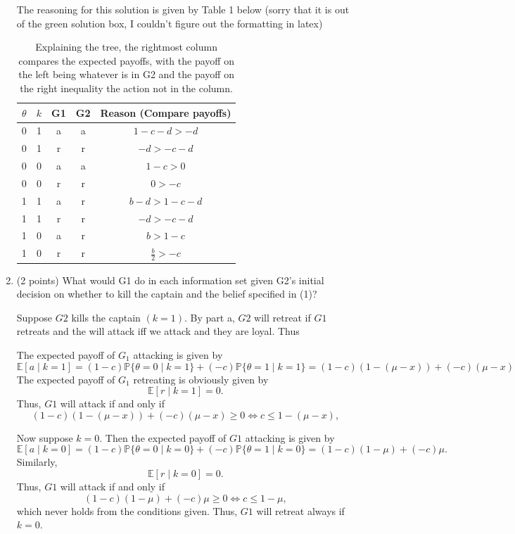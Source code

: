 \documentclass[11pt]{article}
\newcommand{\bbE}{\mathbb{E}}
\newcommand{\bbP}{\mathbb{P}}
\begin{document}
\begin{enumerate}[label=1.\arabic*.]
\begin{solution}
The reasoning for this solution is given by Table 1 below (sorry that it is out of the green solution box, I couldn't figure out the formatting in latex)
\end{solution}
\begin{table} [H] 
\centering\begin{tabular}{|c|c|c|c|c|} \hline 
         $\theta$&  $k$&  G1&  G2& Reason (Compare payoffs)\\ \hline 
         0&  1&  a&  a& $1-c-d > -d$\\ \hline 
         0&  1&  r&  r& $-d>-c-d$\\ \hline 
         0&  0&  a&  a& $1-c >0$\\ \hline 
         0&  0&  r&  r& $0>-c$\\ \hline 
         1&  1&  a&  r& $b-d >1-c-d$\\ \hline 
 1& 1& r& r&$-d>-c-d$\\ \hline 
 1& 0& a& r&$b>1-c$\\ \hline 
 1& 0& r& r&$\frac{b}{2} >-c$\\ \hline\end{tabular}
    \caption{Explaining the tree, the rightmost column compares the expected payoffs, with the payoff on the left being whatever is in G2 and the payoff on the right inequality the action not in the column.}
\end{table}

    
    \item (2 points) What would G1 do in each information set given G2’s initial decision on whether to kill the captain and the belief specified in (1)?
    \begin{solution}
Suppose $G2$ kills the captain $(k=1).$ By part a, $G2$ will retreat if $G1$ retreats and the will attack iff we attack and they are loyal. Thus

The expected payoff of $G_1$ attacking is given by 
\[\bbE[a \mid k=1 ] = (1-c)\bbP\{\theta = 0 \mid k=1\} + (-c)\bbP\{\theta = 1 \mid k =1\} = (1-c)(1- (\mu - x)) + (-c)(\mu - x)\]
The expected payoff of $G_1$ retreating is obviously given by 
\[\bbE[r \mid k = 1] = 0.\] Thus, $G1$ will attack if and only if 
\[(1-c)(1- (\mu - x)) + (-c)(\mu - x) \geq 0 \iff c \leq 1 - (\mu -x),\]

Now suppose $k = 0.$ Then the expected payoff of $G1$ attacking is given by 
\[\bbE[a \mid k  = 0] = (1-c)\bbP\{\theta = 0 \mid k =0\} + (-c)\bbP\{\theta = 1 \mid k= 0\} = (1-c)(1-\mu) + (-c)\mu.\] Similarly, 
\[\bbE[r \mid k = 0] = 0.\] Thus, $G1$ will attack if and only if 
\[(1-c)(1-\mu) + (-c)\mu  \geq 0\iff c\leq 1 - \mu,\] which never holds from the conditions given. Thus, $G1$ will retreat always if $k = 0.$


\end{solution}
\end{enumerate}
\end{document}
